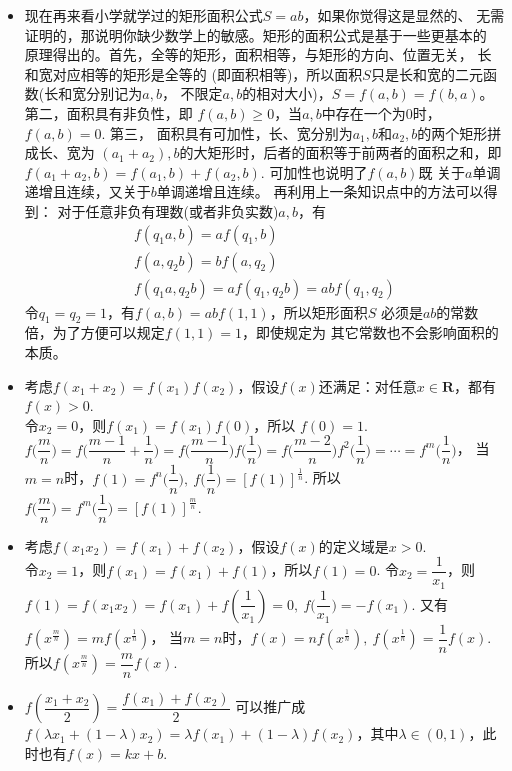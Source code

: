 \begin{itemize}[leftmargin=\inteval{\myitemleftmargin}pt,itemsep=
   \inteval{\myitemitempsep}pt,topsep=\inteval{\myitemtopsep}pt]
\item 现在再来看小学就学过的矩形面积公式$ S=ab $，如果你觉得这是显然的、
无需证明的，那说明你缺少数学上的敏感。矩形的面积公式是基于一些更基本的
原理得出的。首先，全等的矩形，面积相等，与矩形的方向、位置无关，
长和宽对应相等的矩形是全等的
(即面积相等)，所以面积$ S $只是长和宽的二元函数(长和宽分别记为$ a,b $，
不限定$ a,b $的相对大小)，$ S=f(a,b)=f(b,a) $。第二，面积具有非负性，即
$ f(a,b)\geq 0 $，当$ a,b $中存在一个为0时，$ f(a,b)=0 $. 第三，
面积具有可加性，长、宽分别为$ a_1,b $和$ a_2,b $的两个矩形拼成长、宽为
$ (a_1+a_2),b $的大矩形时，后者的面积等于前两者的面积之和，即
$ f(a_1+a_2,b)=f(a_1,b)+f(a_2,b) $. 可加性也说明了$ f(a,b) $既
关于$ a $单调递增且连续，又关于$ b $单调递增且连续。
再利用上一条知识点中的方法可以得到：
对于任意非负有理数(或者非负实数)$ a,b $，有
\begin{gather*}
    f(q_1a,b)=a f(q_1,b)  \\
    f(a,q_2b)=b f(a,q_2)  \\
    f(q_1a,q_2b)=af(q_1,q_2b)=abf(q_1,q_2)
\end{gather*}
令$ q_1=q_2=1 $，有$ f(a,b)=abf(1,1) $，所以矩形面积$ S $
必须是$ ab $的常数倍，为了方便可以规定$ f(1,1)=1 $，即使规定为
其它常数也不会影响面积的本质。

\item 考虑$ f(x_1+x_2)=f(x_1)f(x_2) $，假设$ f(x) $还满足：对任意$ x\in 
\textbf{R} $，都有$ f(x)> 0 $. \\ 令$ x_2=0 $，则$ f(x_1)=f(x_1)f(0) $，所以
$ f(0)=1 $. $ f\Big(\dfrac{m}{n}\Big)=f\Big(\dfrac{m-1}{n}+\dfrac{1}{n}\Big)=
f\Big(\dfrac{m-1}{n}\Big)f\Big(\dfrac{1}{n}\Big)=f\Big(\dfrac{m-2}{n}\Big)f^2
\Big(\dfrac{1}{n}\Big)=\cdots =f^m\Big(\dfrac{1}{n}\Big) $，
当$ m=n $时，$ f(1)=f^n\Big(\dfrac{1}{n}\Big),\ f\Big(\dfrac{1}{n}\Big)
=[f(1)]^{\frac{1}{n}} $. 
所以$f\Big(\dfrac{m}{n}\Big)=f^m\Big(\dfrac{1}{n}\Big)=[f(1)]^{\frac{m}{n}} $. 

\item 考虑$ f(x_1x_2)=f(x_1)+f(x_2) $，假设$ f(x) $的定义域是$ x> 0 $. \\
令$ x_2=1 $，则$ f(x_1)=f(x_1)+f(1) $，所以$ f(1)=0 $. 
令$ x_2=\dfrac{1}{x_1} $，则$ f(1)=f(x_1x_2)=f(x_1)+f(\dfrac{1}{x_1})=0 ,
\ f\Big(\dfrac{1}{x_1}\Big)=-f(x_1) $. 又有
$ f(x^{\frac{m}{n}})=mf(x^{\frac{1}{n}}) $，
当$ m=n $时，$ f(x)=nf(x^{\frac{1}{n}}),\ f(x^{\frac{1}{n}})=\dfrac{1}{n}f(x) $. 
所以$ f(x^{\frac{m}{n}})=\dfrac{m}{n}f(x) $. 

\item $ f\left(\dfrac{x_1+x_2}{2}\right) =\dfrac{f(x_1)+f(x_2)}{2} $
可以推广成$ f\left(\lambda x_1+(1-\lambda)x_2\right) =\lambda f(x_1)+
(1-\lambda)f(x_2) $，其中$ \lambda \in (0,1) $，此时也有$ f(x)=kx+b $. 


\end{itemize}
